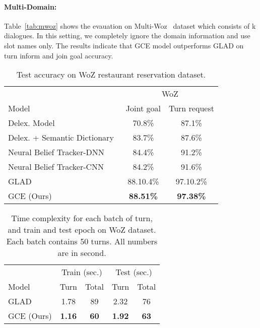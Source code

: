 \documentclass{article}
\begin{document}
\paragraph{Multi-Domain:} Table~\ref{tab:mwoz} shows the evauation on Multi-Woz~\citep{Budzianowski2018MultiWOZA} dataset which consists of k dialogues. In this setting, we completely ignore the domain information and use slot names only. The results indicate that GCE model outperforms GLAD on turn inform and join goal accuracy.

\renewcommand{\tabcolsep}{0.04cm}
\begin{table}[h!]
\caption{Test accuracy on WoZ restaurant reservation dataset.}
\label{tab:woz}
\centering
\begin{tabular}{lcc}
\toprule
 &  \multicolumn{2}{c}{WoZ} \\
Model & Joint goal & Turn request\\
\toprule
 \small Delex. Model~\citep{Mrksic2017NeuralBT} & 70.8\% & 87.1\% \\
 \small Delex. + Semantic Dictionary~\citep{Mrksic2017NeuralBT} & 83.7\% & 87.6\% \\
 \small Neural Belief Tracker-DNN~\citep{Mrksic2017NeuralBT} & 84.4\% & 91.2\% \\
\small Neural Belief Tracker-CNN~\citep{Wen2017ANE} & 84.2\% & 91.6\% \\
\small GLAD~\citep{Zhong2018GlobalLocallySD} & 88.10.4\% &  97.10.2\% \\
\small GCE (Ours) & \textbf{88.51\%} & \textbf{97.38\%} \\
\bottomrule
\end{tabular}
\end{table}


\renewcommand{\tabcolsep}{0.3cm}
 \begin{table}
\caption{Time complexity for each batch of turn, and train and test epoch on WoZ dataset. Each batch contains 50 turns. All numbers are in second.}
\label{tab:time}
\centering
\begin{tabular}{lcccc}
\toprule
 &  \multicolumn{2}{c}{Train (sec.)} & \multicolumn{2}{c}{Test (sec.)}\\
Model & Turn & Total & Turn & Total \\
\toprule
\small GLAD~\citep{Zhong2018GlobalLocallySD} &  1.78 & 89 & 2.32 & 76 \\
\small GCE (Ours) & \textbf{1.16} & \textbf{60} &  \textbf{1.92} & \textbf{63} \\
\bottomrule
\end{tabular}
\end{table}
\end{document}
